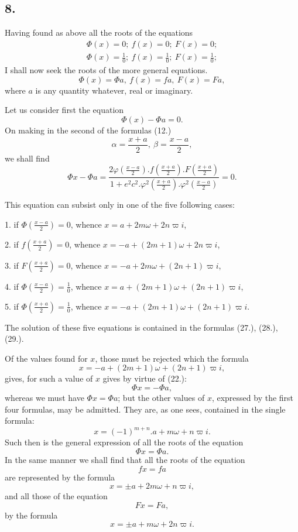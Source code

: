 \documentclass{article}
\begin{document}
\subsection*{8.}

Having found as above all the roots of the equations
\[ \begin{gathered} \Phi(x)=0;\ f(x)=0;\ F(x)=0;\\ \Phi(x)=\frac{1}{0};\ f(x)=\frac{1}{0};\ F(x)=\frac{1}{0}; \end{gathered} \]
I shall now seek the roots of the more general equations.
\[ \Phi(x)=\Phi a,\ f(x)=fa,\ F(x)=Fa, \]
where $a$ is any quantity whatever, real or imaginary.

Let us consider first the equation
\[ \Phi(x)-\Phi a=0. \]
On making in the second of the formulas (12.)
\[ \alpha=\frac{x+a}{2},\ \beta=\frac{x-a}{2}, \]
we shall find
\[ \Phi x-\Phi a=\frac{2\varphi\left(\frac{x-a}{2}\right).f\left(\frac{x+a}{2}\right).F\left(\frac{x+a}{2}\right)}{1+e^{2}c^{2}.\varphi^{2}\left(\frac{x+a}{2}\right).\varphi^{2}\left(\frac{x-a}{2}\right)}=0. \]

This equation can subsist only in one of the five following cases:

1. if $\Phi\left(\frac{x-a}{2}\right)=0$, whence $x=a+2m\omega+2n\varpi i$,

2. if $f\left(\frac{x+a}{2}\right)=0$, whence $x=-a+(2m+1)\omega+2n\varpi i$,

3. if $F\left(\frac{x+a}{2}\right)=0$, whence $x=-a+2m\omega+(2n+1)\varpi i$,

4. if $\Phi\left(\frac{x-a}{2}\right)=\frac{1}{0}$, whence $x=a+(2m+1)\omega+(2n+1)\varpi i$,

5. if $\Phi\left(\frac{x+a}{2}\right)=\frac{1}{0}$, whence $x=-a+(2m+1)\omega+(2n+1)\varpi i$.

The solution of these five equations is contained in the formulas (27.), (28.), (29.).

Of the values found for $x$, those must be rejected which the formula
\[ x=-a+(2m+1)\omega+(2n+1)\varpi i, \]
gives, for such a value of $x$ gives by virtue of (22.):
\[ \Phi x=-\Phi a, \]
whereas we must have $\Phi x=\Phi a$; but the other values of $x$, expressed by the first four formulas, may be admitted. They are, as one sees, contained in the single formula:
\[ x=(-1)^{m+n}.a+m\omega+n\varpi i. \tag{31.} \]
Such then is the general expression of all the roots of the equation
\[ \Phi x=\Phi a. \]
In the same manner we shall find that all the roots of the equation
\[ fx=fa \]
are represented by the formula
\[ x=\pm a+2m\omega+n\varpi i, \tag{32.} \]
and all those of the equation
\[ Fx=Fa, \]
by the formula
\[ x=\pm a+m\omega+2n\varpi i. \tag{33.} \]
\end{document}
